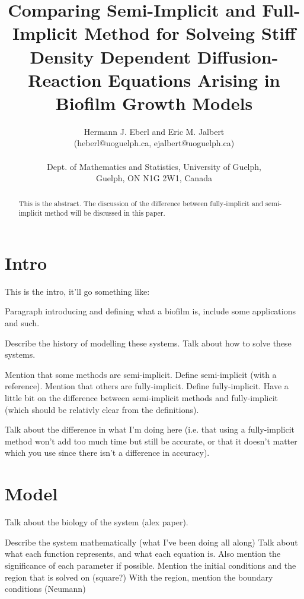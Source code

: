 \documentclass{article}
\begin{document}
\title{Comparing Semi-Implicit and Full-Implicit Method for Solveing Stiff Density Dependent Diffusion-Reaction Equations Arising in Biofilm Growth Models}
\author{Hermann J. Eberl and Eric M. Jalbert\\
  (heberl@uoguelph.ca, ejalbert@uoguelph.ca)\\ \\
  Dept. of Mathematics and Statistics, University of Guelph,\\ 
  Guelph, ON N1G 2W1, Canada}
\maketitle

\begin{abstract}
  This is the abstract. The discussion of the difference between fully-implicit and semi-implicit method will be discussed in this paper.
\end{abstract}

\section{Intro}
  This is the intro, it'll go something like:
  
  Paragraph introducing and defining what a biofilm is, include some applications and such.
  
  Describe the history of modelling these systems.
  Talk about how to solve these systems.

  Mention that some methods are semi-implicit.
  Define semi-implicit (with a reference).
  Mention that others are fully-implicit.
  Define fully-implicit.
  Have a little bit on the difference between semi-implicit methods and fully-implicit (which should be relativly clear from the definitions).

  Talk about the difference in what I'm doing here (i.e. that using a fully-implicit method won't add too much time but still be accurate, or that it doesn't matter which you use since there isn't a difference in accuracy). 

\section{Model}
  Talk about the biology of the system (alex paper).

  Describe the system mathematically (what I've been doing all along)
  Talk about what each function represents, and what each equation is. 
  Also mention the significance of each parameter  if possible.
  Mention the initial conditions and the region that is solved on (square?)
  With the region, mention the boundary conditions (Neumann)
\end{document}
